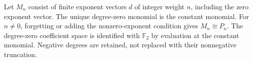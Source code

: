 \begin{definition}
  \label{def:h6-full-milnor-monomials}
  \leanok
  Let $M_n$ consist of finite exponent vectors $d$ of integer weight $n$,
  including the zero exponent vector. The unique degree-zero monomial
  is the constant monomial. For $n\ne0$, forgetting or adding the
  nonzero-exponent condition gives $M_n\cong P_n$.
  The degree-zero coefficient space is identified with $\mathbb F_2$
  by evaluation at the constant monomial. Negative degrees are retained,
  not replaced with their nonnegative truncation.
\end{definition}

